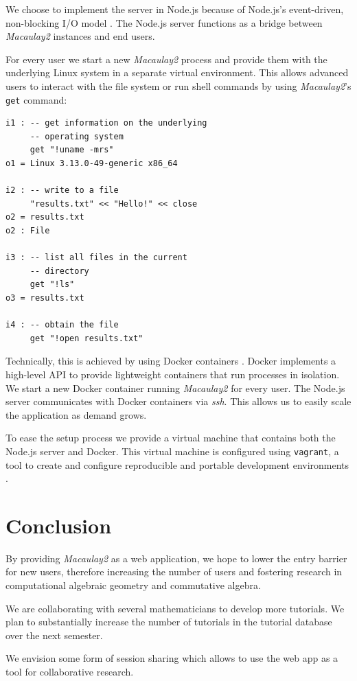 \documentclass[twocolumn]{article}
\def\M2{{\it Macaulay2}}
\begin{document}
We choose to implement the server in Node.js
because of Node.js's event-driven, non-blocking I/O model \cite{nodejs}.
The Node.js server functions as a bridge between \M2 instances and end users.

For every user we start a new \M2 process and
provide them with the underlying Linux system in a separate virtual environment.
This allows advanced users to
interact with the file system or run shell commands by using \M2's {\tt get} 
command:

\begin{verbatim}
i1 : -- get information on the underlying
     -- operating system
     get "!uname -mrs" 
o1 = Linux 3.13.0-49-generic x86_64

i2 : -- write to a file     
     "results.txt" << "Hello!" << close
o2 = results.txt
o2 : File

i3 : -- list all files in the current
     -- directory
     get "!ls"
o3 = results.txt

i4 : -- obtain the file
     get "!open results.txt"
\end{verbatim}

Technically, this is achieved by using Docker containers \cite{docker}. Docker implements
a high-level API to provide lightweight containers that run processes in isolation.
We start a new Docker container running \M2 for every user. The Node.js
server communicates with Docker containers via {\it ssh}. This allows us to easily
scale the application as demand grows.

To ease the setup process we provide a virtual machine that contains both the Node.js server
and Docker. This virtual machine is configured using {\tt vagrant}, a tool to create and
configure reproducible and portable development environments \cite{vagrant}.

\section{Conclusion}

By providing \M2 as a web application, we hope to lower the
 entry barrier for new users, therefore increasing the number 
 of users and fostering research in computational algebraic geometry and commutative algebra. 


We are collaborating with several mathematicians to develop more tutorials.
We plan to substantially increase the number of tutorials in the tutorial database over the next semester.


We envision some form of session sharing which allows to use the web app as a tool for collaborative research.
\end{document}
